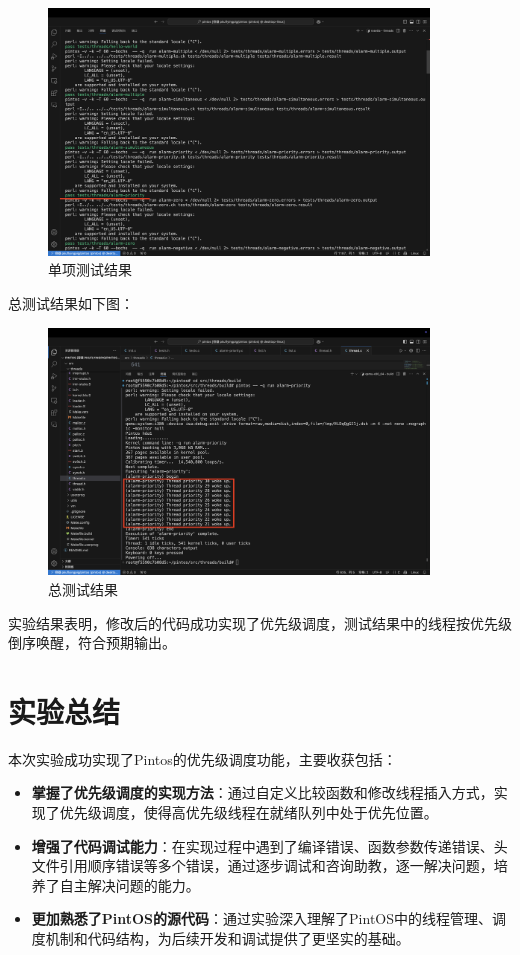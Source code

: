 \documentclass{article}
\begin{document}
\begin{figure}[H]
	\centering
	\includegraphics[width=0.9\textwidth]{img/pass.png}
	\caption{单项测试结果}
\end{figure}

总测试结果如下图：

\begin{figure}[H]
	\centering
	\includegraphics[width=0.9\textwidth]{img/run_final.png}
	\caption{总测试结果}
\end{figure}

实验结果表明，修改后的代码成功实现了优先级调度，测试结果中的线程按优先级倒序唤醒，符合预期输出。

\normalsize

\section{实验总结}

本次实验成功实现了Pintos的优先级调度功能，主要收获包括：

\begin{itemize}
	\item \textbf{掌握了优先级调度的实现方法}：通过自定义比较函数和修改线程插入方式，实现了优先级调度，使得高优先级线程在就绪队列中处于优先位置。
	\item \textbf{增强了代码调试能力}：在实现过程中遇到了编译错误、函数参数传递错误、头文件引用顺序错误等多个错误，通过逐步调试和咨询助教，逐一解决问题，培养了自主解决问题的能力。
	\item \textbf{更加熟悉了PintOS的源代码}：通过实验深入理解了PintOS中的线程管理、调度机制和代码结构，为后续开发和调试提供了更坚实的基础。
\end{itemize}
\end{document}
